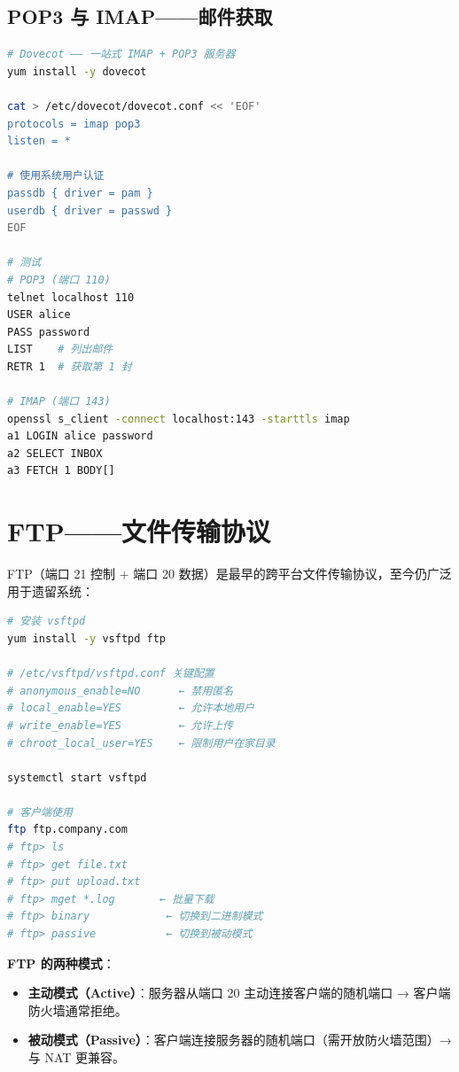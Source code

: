 \documentclass[12pt,UTF8]{ctexbook}
\begin{document}
\subsection{POP3 与 IMAP——邮件获取}

\begin{lstlisting}[language=bash]
# Dovecot —— 一站式 IMAP + POP3 服务器
yum install -y dovecot

cat > /etc/dovecot/dovecot.conf << 'EOF'
protocols = imap pop3
listen = *

# 使用系统用户认证
passdb { driver = pam }
userdb { driver = passwd }
EOF

# 测试
# POP3 (端口 110)
telnet localhost 110
USER alice
PASS password
LIST    # 列出邮件
RETR 1  # 获取第 1 封

# IMAP (端口 143)
openssl s_client -connect localhost:143 -starttls imap
a1 LOGIN alice password
a2 SELECT INBOX
a3 FETCH 1 BODY[]
\end{lstlisting}

\section{FTP——文件传输协议}
\label{sec:ftp}

FTP（端口 21 控制 + 端口 20 数据）是最早的跨平台文件传输协议，至今仍广泛用于遗留系统：

\begin{lstlisting}[language=bash]
# 安装 vsftpd
yum install -y vsftpd ftp

# /etc/vsftpd/vsftpd.conf 关键配置
# anonymous_enable=NO      ← 禁用匿名
# local_enable=YES         ← 允许本地用户
# write_enable=YES         ← 允许上传
# chroot_local_user=YES    ← 限制用户在家目录

systemctl start vsftpd

# 客户端使用
ftp ftp.company.com
# ftp> ls
# ftp> get file.txt
# ftp> put upload.txt
# ftp> mget *.log       ← 批量下载
# ftp> binary            ← 切换到二进制模式
# ftp> passive           ← 切换到被动模式
\end{lstlisting}

\textbf{FTP 的两种模式}：

\begin{itemize}
    \item \textbf{主动模式（Active）}：服务器从端口 20 主动连接客户端的随机端口 → 客户端防火墙通常拒绝。
    \item \textbf{被动模式（Passive）}：客户端连接服务器的随机端口（需开放防火墙范围）→ 与 NAT 更兼容。
\end{itemize}
\end{document}
